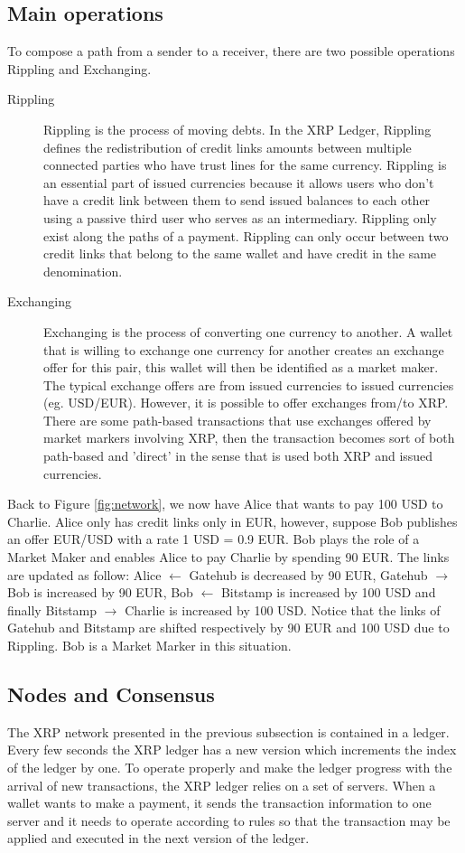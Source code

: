 \subsection{Main operations}
To compose a path from a sender to a receiver, there are two possible operations Rippling and Exchanging.
\begin{description}
\item[Rippling] Rippling is the process of moving debts. In the XRP Ledger, Rippling defines the redistribution of credit links amounts between multiple connected parties who have trust lines for the same currency. Rippling is an essential part of issued currencies because it allows users who don't have a credit link between them to send issued balances to each other using a passive third user who serves as an intermediary. Rippling only exist along the paths of a payment. Rippling can only occur between two credit links that belong to the same wallet and have credit in the same denomination.
\item[Exchanging] Exchanging is the process of converting one currency to another. A wallet that is willing to exchange one currency for another creates an exchange offer for this pair, this wallet will then be identified as a market maker. The typical exchange offers are from issued currencies to issued currencies (eg. USD/EUR). However, it is possible to offer exchanges from/to XRP. There are some path-based transactions that use exchanges offered by market markers involving XRP, then the transaction becomes sort of both path-based and 'direct' in the sense that is used both XRP and issued currencies.
\end{description}
Back to Figure \ref{fig:network}, we now have Alice that wants to pay 100 USD to Charlie. Alice only has credit links only in EUR, however, suppose Bob publishes an offer EUR/USD with a rate 1 USD = 0.9 EUR. Bob plays the role of a Market Maker and enables Alice to pay Charlie by spending 90 EUR. The links are updated as follow: Alice $\leftarrow$ Gatehub is decreased by 90 EUR, Gatehub $\rightarrow$ Bob is increased by 90 EUR, Bob $\leftarrow$ Bitstamp is increased by 100 USD and finally Bitstamp $\rightarrow$ Charlie is increased by 100 USD.
Notice that the links of Gatehub and Bitstamp are shifted respectively by 90 EUR and 100 USD due to Rippling. Bob is a Market Marker in this situation.

\subsection{Nodes and Consensus}
The XRP network presented in the previous subsection is contained in a ledger. Every few seconds the XRP ledger has a new version which increments the index of the ledger by one. To operate properly and make the ledger progress with the arrival of new transactions, the XRP ledger relies on a set of servers. When a wallet wants to make a payment, it sends the transaction information to one server and it needs to operate according to rules so that the transaction may be applied and executed in the next version of the ledger.


